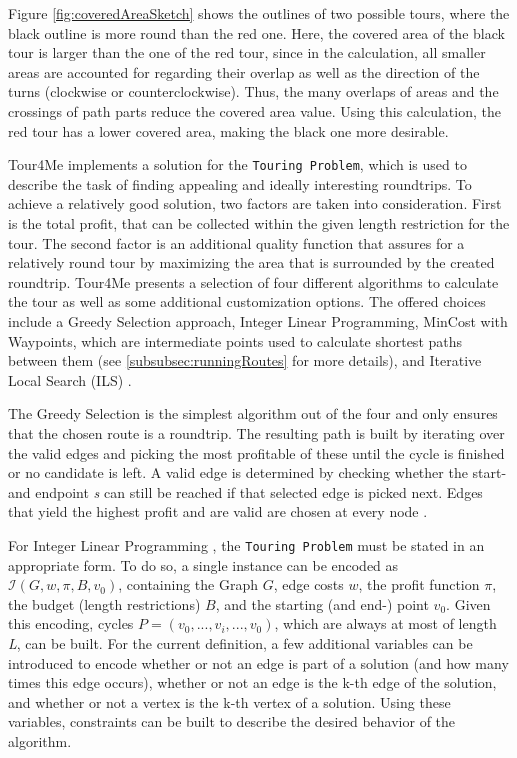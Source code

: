 Figure \ref{fig:coveredAreaSketch} shows the outlines of two possible tours, where the black outline is more round than the red one. 
Here, the covered area of the black tour is larger than the one of the red tour, since in the calculation, all smaller areas are accounted for regarding their overlap as well as the direction of the turns (clockwise or counterclockwise).
Thus, the many overlaps of areas and the crossings of path parts reduce the covered area value.
Using this calculation, the red tour has a lower covered area, making the black one more desirable.



Tour4Me implements a solution for the \texttt{Touring Problem}, which is used to describe the task of finding appealing and ideally interesting roundtrips.
To achieve a relatively good solution, two factors are taken into consideration.
First is the total profit, that can be collected within the given length restriction for the tour.
The second factor is an additional quality function that assures for a relatively round tour by maximizing the area that is surrounded by the created roundtrip.
Tour4Me presents a selection of four different algorithms to calculate the tour as well as some additional customization options.
The offered choices include a Greedy Selection approach, Integer Linear Programming, MinCost with Waypoints, which are intermediate points used to calculate shortest paths between them (see \ref{subsubsec:runningRoutes} for more details), and Iterative Local Search (ILS) \cite{buchin_tour4me_2022}. 

The Greedy Selection \cite{buchin_tour4me_2022, wayahdi_greedy_2021} is the simplest algorithm out of the four and only ensures that the chosen route is a roundtrip.
The resulting path is built by iterating over the valid edges and picking the most profitable of these until the cycle is finished or no candidate is left.
A valid edge is determined by checking whether the start- and endpoint \textit{s} can still be reached if that selected edge is picked next. 
Edges that yield the highest profit and are valid are chosen at every node \cite{buchin_tour4me_2022, wayahdi_greedy_2021}.


For Integer Linear Programming \cite{buchin_tour4me_2022, graver_foundations_1975}, the \texttt{Touring Problem} must be stated in an appropriate form.
To do so, a single instance can be encoded as $\mathcal{I}(G, w, \pi, B, v_0)$, containing the Graph $G$, edge costs $w$, the profit function $\pi$, the budget (length restrictions) $B$, and the starting (and end-) point $v_0$.
Given this encoding, cycles $P=(v_0,...,v_i,...,v_0)$, which are always at most of length \textit{L}, can be built.
For the current definition, a few additional variables can be introduced to encode whether or not an edge is part of a solution (and how many times this edge occurs), whether or not an edge is the k-th edge of the solution, and whether or not a vertex is the k-th vertex of a solution. 
Using these variables, constraints can be built to describe the desired behavior of the algorithm.


